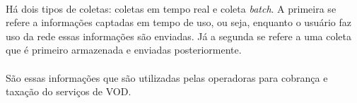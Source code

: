 \paragraph{}
H\'a dois tipos de coletas: coletas em tempo real e coleta \textit{batch}. A primeira se refere a informa\c{c}\~oes captadas em tempo de uso, ou seja, enquanto o usu\'ario faz uso da rede essas informa\c{c}\~oes s\~ao enviadas. J\'a a segunda se refere a uma coleta que \'e primeiro armazenada e enviadas posteriormente. 
\paragraph{}
S\~ao essas informa\c{c}\~oes que s\~ao utilizadas pelas operadoras para cobran\c{c}a e taxa\c{c}\~ao do servi\c{c}os de VOD.